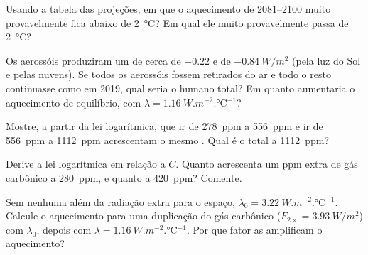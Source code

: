 \begin{exercise}[$\star\star$]\label{exo:g12:climate-change:11}
Usando a tabela das projeções, em que  o aquecimento de 2081--2100
muito provavelmente fica abaixo de \qty{2}{\degreeCelsius}? Em qual ele muito
provavelmente passa de \qty{2}{\degreeCelsius}?
\end{exercise}

\begin{exercise}[$\star\star\star$]\label{exo:g12:climate-change:12}
Os aerossóis produziram um  de cerca de $-0.22$ e de
$\qty{-0.84}{W/m^2}$ (pela luz do Sol e pelas nuvens). Se todos os
aerossóis fossem retirados do ar e todo o resto continuasse como em 2019,
qual seria o  humano total? Em quanto aumentaria o aquecimento de
equilíbrio, com $\lambda = \qty{1.16}{W.m^{-2}.\degreeCelsius^{-1}}$?
\end{exercise}

\begin{exercise}[$\star\star\star$]\label{exo:g12:climate-change:13}
Mostre, a partir da lei logarítmica, que ir de \qty{278}{ppm} a
\qty{556}{ppm} e ir de \qty{556}{ppm} a \qty{1112}{ppm} acrescentam o mesmo
. Qual é o  total a \qty{1112}{ppm}?
\end{exercise}

\begin{exercise}[$\star\star\star$]\label{exo:g12:climate-change:14}
Derive a lei logarítmica em relação a $C$. Quanto  acrescenta um
ppm extra de gás carbônico a \qty{280}{ppm}, e quanto a \qty{420}{ppm}?
Comente.
\end{exercise}

\begin{exercise}[$\star\star\star$]\label{exo:g12:climate-change:15}
Sem nenhuma  além da radiação extra para o espaço,
$\lambda_0 = \qty{3.22}{W.m^{-2}.\degreeCelsius^{-1}}$. Calcule o aquecimento
para uma duplicação do gás carbônico ($F_{2\times} = \qty{3.93}{W/m^2}$) com
$\lambda_0$, depois com $\lambda = \qty{1.16}{W.m^{-2}.\degreeCelsius^{-1}}$. Por
que fator as  amplificam o aquecimento?
\end{exercise}

